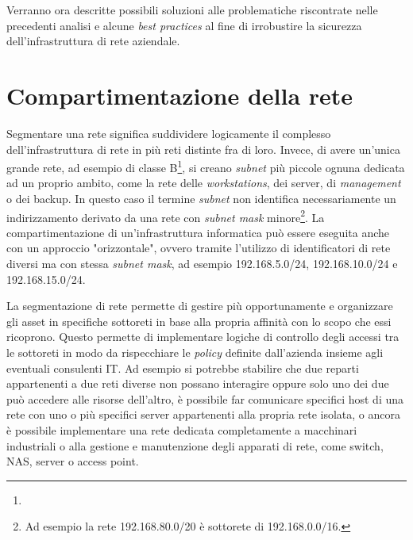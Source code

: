 \documentclass[target=bach,aauheader=]{thud}
\begin{document}
Verranno ora descritte possibili soluzioni alle problematiche riscontrate nelle precedenti analisi e alcune \textit{best practices} al fine di irrobustire la sicurezza dell'infrastruttura di rete aziendale.

\section{Compartimentazione della rete}

Segmentare una rete significa suddividere logicamente il complesso dell'infrastruttura di rete in più reti distinte fra di loro. Invece, di avere un'unica grande rete, ad esempio di classe B\footnote{}, si creano \textit{subnet} più piccole ognuna dedicata ad un proprio ambito, come la rete delle \textit{workstations}, dei server, di \textit{management} o dei backup. In questo caso il termine \textit{subnet} non identifica necessariamente un indirizzamento derivato da una rete con \textit{subnet mask} minore\footnote{Ad esempio la rete 192.168.80.0/20 è sottorete di 192.168.0.0/16.}. La compartimentazione di un'infrastruttura informatica può essere eseguita anche con un approccio "orizzontale", ovvero tramite l'utilizzo di identificatori di rete diversi ma con stessa \textit{subnet mask}, ad esempio 192.168.5.0/24, 192.168.10.0/24 e 192.168.15.0/24.

La segmentazione di rete permette di gestire più opportunamente e organizzare gli asset in specifiche sottoreti in base alla propria affinità con lo scopo che essi ricoprono. Questo permette di implementare logiche di controllo degli accessi tra le sottoreti in modo da rispecchiare le \textit{policy} definite dall'azienda insieme agli eventuali consulenti IT. Ad esempio si potrebbe stabilire che due reparti appartenenti a due reti diverse non possano interagire oppure solo uno dei due può accedere alle risorse dell'altro, è possibile far comunicare specifici host di una rete con uno o più specifici server appartenenti alla propria rete isolata, o ancora è possibile implementare una rete dedicata completamente a macchinari industriali o alla gestione e manutenzione degli apparati di rete, come switch, NAS, server o access point.
\end{document}
